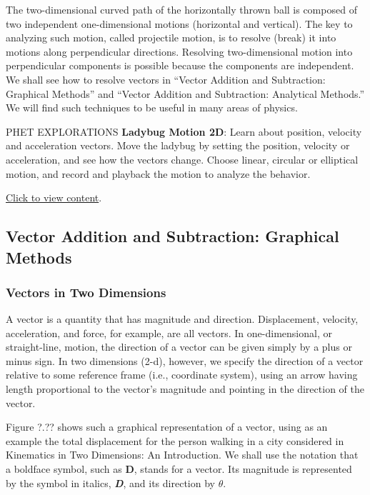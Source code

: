 \documentclass[../../main-ap-physics.tex]{subfiles}
\begin{document}
\vspace{1em}

The two-dimensional curved path of the horizontally thrown ball is composed of two independent one-dimensional motions (horizontal and vertical). The key to analyzing such motion, called projectile motion, is to resolve (break) it into motions along perpendicular directions. Resolving two-dimensional motion into perpendicular components is possible because the components are independent. We shall see how to resolve vectors in ``Vector Addition and Subtraction: Graphical Methods'' and ``Vector Addition and Subtraction: Analytical Methods.'' We will find such techniques to be useful in many areas of physics.

\begin{gradient}{PHET EXPLORATIONS}
    \textbf{Ladybug Motion 2D}: Learn about position, velocity and acceleration vectors. Move the ladybug by setting the position, velocity or acceleration, and see how the vectors change. Choose linear, circular or elliptical motion, and record and playback the motion to analyze the behavior.

    \vspace{1em}

    \href{https://openstax.org/l/28ladybugmotion}{Click to view content}.
\end{gradient}

\subsection{Vector Addition and Subtraction: Graphical Methods}

\subsubsection*{Vectors in Two Dimensions}

A \gls{vector} is a quantity that has magnitude and direction. Displacement, velocity, acceleration, and force, for example, are all vectors. In one-dimensional, or straight-line, motion, the direction of a vector can be given simply by a plus or minus sign. In two dimensions (2-d), however, we specify the direction of a vector relative to some reference frame (i.e., coordinate system), using an arrow having length proportional to the vector's magnitude and pointing in the direction of the vector.

\vspace{1em}
Figure ?.?? shows such a graphical representation of a vector, using as an example the total displacement for the person walking in a city considered in Kinematics in Two Dimensions: An Introduction. We shall use the notation that a boldface symbol, such as $\mathbf{D}$, stands for a vector. Its magnitude is represented by the symbol in italics, \textbf{\textit{D}}, and its direction by $\theta$.
\end{document}
